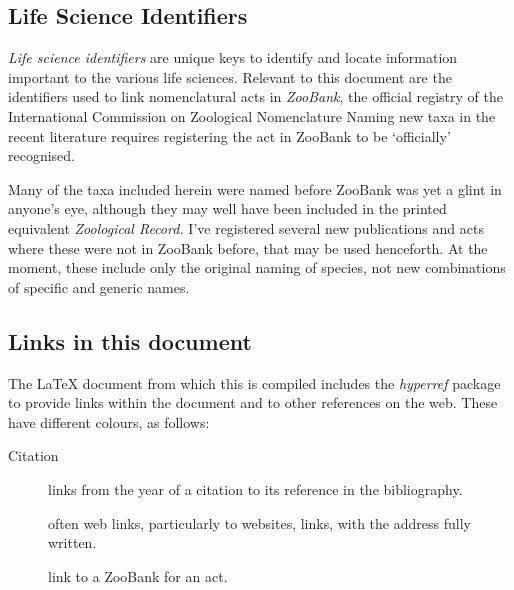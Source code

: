 \documentclass[notuftebib,font=source,UKenglish]{tufte-lualatex}
\begin{document}
\subsection{Life Science Identifiers }%
\label{ssec:introduction-lsid}

\emph{Life science
identifiers} are unique keys
to identify and locate information important to the various life sciences.
Relevant to this document are the identifiers used to link nomenclatural acts in
\emph{ZooBank}, the official registry of the International
Commission on Zoological Nomenclature  Naming new taxa in the
recent literature requires registering the act in ZooBank to be ‘officially’
recognised.

Many of the taxa included herein were named before ZooBank was yet a glint in
anyone's eye, although they may well have been included in the printed
equivalent \emph{Zoological Record.} I've registered several new publications
and acts where these were not in ZooBank before, that may be used henceforth. At
the moment, these include only the original naming of species, not new
combinations of specific and generic names.

\subsection{Links in this document}%
\label{sub:introduction-links}

The \LaTeX{} document from which this  is compiled includes the
\emph{hyperref} package to provide links within the
document and to other references on the
web. These have different
colours, as follows:

\begin{description}
    \item[\textcolor{citelinkcolour}{Citation}] links from the year of
        a citation to its reference in the bibliography.
    \item[\textallsc{\textcolor{urllinkcolour}{URL}}] often web links,
        particularly to websites,  links,  with
        the address fully written.
    \item[{\upshape{}}] link to a ZooBank  for an act.
\end{description}
\end{document}
